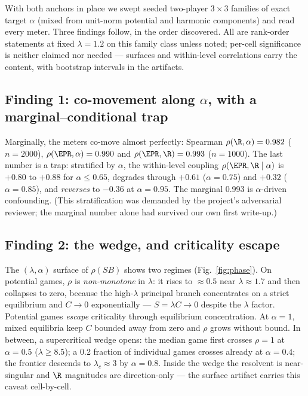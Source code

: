 With both anchors in place we swept seeded two-player $3\times3$ families of
exact target $\alpha$ (mixed from unit-norm potential and harmonic components)
and read every meter. Three findings follow, in the order discovered. All are
rank-order statements at fixed $\lambda=1.2$ on this family class unless noted;
per-cell significance is neither claimed nor needed --- surfaces and
within-level correlations carry the content, with bootstrap intervals in the
artifacts.

\subsection{Finding 1: co-movement along $\alpha$, with a marginal--conditional trap}
Marginally, the meters co-move almost perfectly: Spearman
$\rho(\R,\alpha)=0.982$ ($n{=}2000$), $\rho(\EPR,\alpha)=0.990$ and
$\rho(\EPR,\R)=0.993$ ($n{=}1000$). The last number is a trap: stratified by
$\alpha$, the within-level coupling $\rho(\EPR,\R\mid\alpha)$ is $+0.80$ to
$+0.88$ for $\alpha\le0.65$, degrades through $+0.61$ ($\alpha{=}0.75$) and
$+0.32$ ($\alpha{=}0.85$), and \emph{reverses} to $-0.36$ at $\alpha=0.95$.
The marginal 0.993 is $\alpha$-driven confounding. (This stratification was
demanded by the project's adversarial reviewer; the marginal number alone had
survived our own first write-up.)

\subsection{Finding 2: the wedge, and criticality escape}
The $(\lambda,\alpha)$ surface of $\rho(SB)$ shows two regimes
(Fig.~\ref{fig:phase}). On potential games, $\rho$ is \emph{non-monotone} in
$\lambda$: it rises to $\approx0.5$ near $\lambda\approx1.7$ and then collapses
to zero, because the high-$\lambda$ principal branch concentrates on a strict
equilibrium and $C\to0$ exponentially --- $S=\lambda C\to0$ despite the
$\lambda$ factor. Potential games \emph{escape} criticality through equilibrium
concentration. At $\alpha=1$, mixed equilibria keep $C$ bounded away from zero
and $\rho$ grows without bound. In between, a supercritical wedge opens: the
median game first crosses $\rho=1$ at $\alpha=0.5$ ($\lambda\ge8.5$); a 0.2
fraction of individual games crosses already at $\alpha=0.4$; the frontier
descends to $\lambda_c\approx3$ by $\alpha=0.8$. Inside the wedge the resolvent
is near-singular and $\R$ magnitudes are direction-only --- the surface
artifact carries this caveat cell-by-cell.


